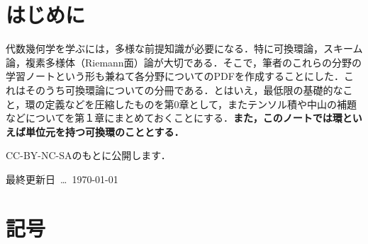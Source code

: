 \documentclass[autodetect-engine,dvi=dvipdfmx,ja=standard,japaram={units}]{bxjsarticle} %
\begin{document}
	
	\nocite{*}
	\newpage
	\part*{はじめに}
	代数幾何学を学ぶには，多様な前提知識が必要になる．特に可換環論，スキーム論，複素多様体（Riemann面）論が大切である．そこで，筆者のこれらの分野の学習ノートという形も兼ねて各分野についてのPDFを作成することにした．これはそのうち可換環論についての分冊である．とはいえ，最低限の基礎的なこと，環の定義などを圧縮したものを第0章として，またテンソル積や中山の補題などについてを第１章にまとめておくことにする．\textbf{また，このノートでは環といえば単位元を持つ可換環のこととする．}
	
	\hspace*{\fill}CC-BY-NC-SAのもとに公開します．
	{\large
		{\ccLogo}
		{\ccAttribution}
		{\ccNonCommercialJP}
		{\ccShareAlike}}
	
	\hspace*{\fill}最終更新日~\dots~\today
	
	
	
	\part*{記号}
	
	
	\newpage
	
	\tableofcontents
	
	
	
	\def\prepartname{付録}
	\def\postpartname{}
	\thepartchange
%	 
	
	
	\printindex
	
	\newpage
	
	
\end{document}
